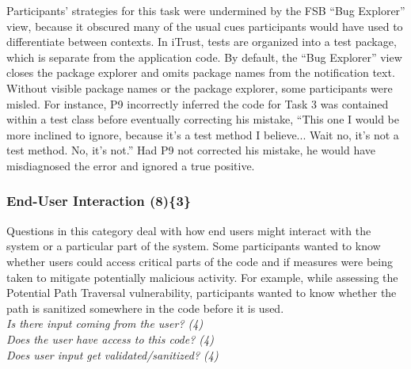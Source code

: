 \documentclass[10pt,journal,compsoc]{IEEEtran}
\begin{document}
Participants' strategies for this task were undermined by the FSB ``Bug Explorer'' view, because it obscured many of the usual cues participants would have used to differentiate between contexts.
In iTrust, tests are organized into a test package, which is separate from the application code. 
By default, the ``Bug Explorer'' view closes the package explorer and omits package names from the notification text.
Without visible package names or the package explorer, some participants were misled.
For instance, P9 incorrectly inferred the code for Task 3 was contained within a test class before eventually correcting his mistake, 
``This one I would be more inclined to ignore, because it's a test method I believe... Wait no, it's not a test method. No, it's not.''
Had P9 not corrected his mistake, he would have misdiagnosed the error and ignored a true positive.







\subsubsection{End-User Interaction (8)\{3\}}

\label{eui}

Questions in this category deal with how end users might interact with the system or a particular part of the system. 
Some participants wanted to know whether users could access critical parts of the code and if measures were being taken to mitigate potentially malicious activity. 
For example, while assessing the Potential Path Traversal vulnerability, participants wanted to know whether the path is sanitized somewhere in the code before it is used.
\\

\noindent\emph{Is there input coming from the user? (4)} \\
\emph{Does the user have access to this code? (4)} \\
\emph{Does user input get validated/sanitized? (4)} 
\\
\end{document}
